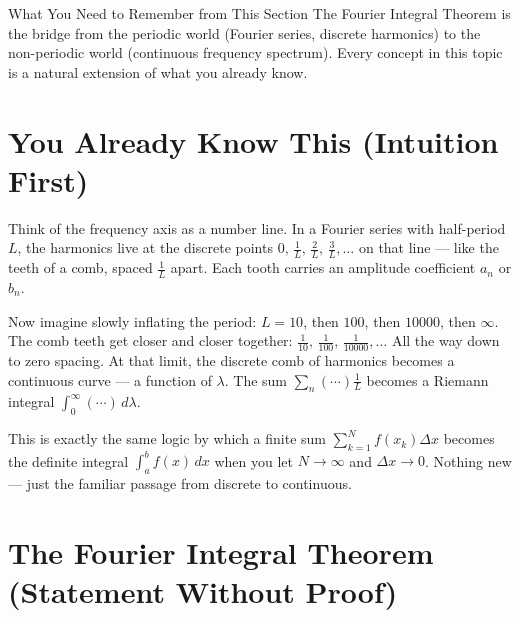 \documentclass[12pt,a4paper]{article}
\begin{document}
\begin{learnbox}{What You Need to Remember from This Section}
The Fourier Integral Theorem is the bridge from the periodic world (Fourier series, discrete harmonics) to the non-periodic world (continuous frequency spectrum). Every concept in this topic is a natural extension of what you already know.
\end{learnbox}

\section{You Already Know This (Intuition First)}

Think of the frequency axis as a number line. In a Fourier series with half-period $L$, the harmonics live at the discrete points $0,\, \frac{1}{L},\, \frac{2}{L},\, \frac{3}{L}, \ldots$ on that line --- like the teeth of a comb, spaced $\frac{1}{L}$ apart. Each tooth carries an amplitude coefficient $a_n$ or $b_n$.

Now imagine slowly inflating the period: $L = 10$, then $100$, then $10000$, then $\infty$. The comb teeth get closer and closer together: $\frac{1}{10},\, \frac{1}{100},\, \frac{1}{10000}, \ldots$ All the way down to zero spacing. At that limit, the discrete comb of harmonics becomes a continuous curve --- a function of $\lambda$. The sum $\sum_n (\cdots)\frac{1}{L}$ becomes a Riemann integral $\int_0^\infty (\cdots)\,d\lambda$.

This is exactly the same logic by which a finite sum $\sum_{k=1}^N f(x_k)\Delta x$ becomes the definite integral $\int_a^b f(x)\,dx$ when you let $N\to\infty$ and $\Delta x\to 0$. Nothing new --- just the familiar passage from discrete to continuous.

\section{The Fourier Integral Theorem (Statement Without Proof)}
\end{document}
